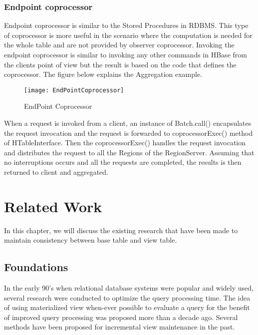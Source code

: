 \documentclass[11pt,a4paper,bibtotoc,idxtotoc,headsepline,footsepline,footexclude,BCOR12mm,DIV13]{scrbook}
\begin{document}
\newpage
\subsection{Endpoint coprocessor}

Endpoint coprocessor is similar to the Stored Procedures in RDBMS. This type of coprocessor is more useful in the scenario where the computation is needed for the whole table and are not provided by observer coprocessor\cite{hbase:coprocessors}. Invoking the endpoint coprocessor is similar to invoking any other commands in HBase from the client\textquotesingle s point of view but the result is based on the code that defines the coprocessor\cite{coprocessor:detail}. The figure below explains the Aggregation example\cite{coprocessor:detail}.

\begin{figure}
    \centering
    \texttt{[image: EndPointCoprocessor]}
    \caption{EndPoint Coprocessor}
    
\end{figure}

When a request is invoked from a client, an instance of Batch.call() encapsulates the request invocation and the request is forwarded to coprocessorExec() method of HTableInterface. Then the coprocessorExec() handles the request invocation and distributes the request to all the Regions of the RegionServer. Assuming that no interruptions occurs and all the requests are completed, the results is then returned to client and aggregated\cite{coprocessor:detail}.


\chapter{Related Work}
\label{chap:relatedwork}
In this chapter, we will discuss the existing research that have been made to maintain consistency between base table and view table.

\section{Foundations}
\label{Foundations}
In the early 90's when relational database systems were popular and widely used, several research were conducted to optimize the query processing time. The idea of using materialized view when-ever possible to evaluate a query for the benefit of improved query processing was proposed more than a decade ago\cite{maintenance:optimizingqueries}. Several methods have been proposed for incremental view maintenance in the past\cite{blakeley:efficiently, gupta:maintaining, agrawal:efficient}.
\end{document}
